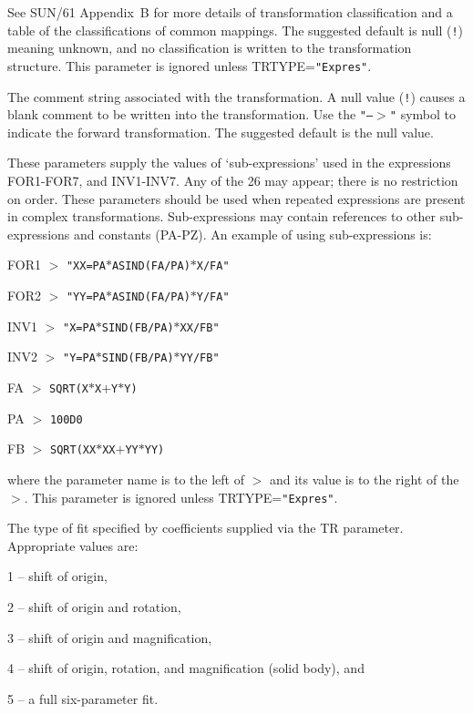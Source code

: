 \documentclass[twoside,11pt]{article}
\newcommand{\sstsubsection}[1]{ \item[{#1}] \mbox{} \\}
\renewcommand{\sstsubsection}[1]{\item[{#1}]}
\begin{document}
{{{         See SUN/61 Appendix~B for more details of transformation
         classification and a table of the classifications of common
         mappings.  The suggested default is null ({\tt !}) meaning unknown,
         and no classification is written to the transformation
         structure.  This parameter is ignored unless TRTYPE={\tt "Expres"}.
      }
      \sstsubsection{
         COMMENT = LITERAL (Read)
      }{
         The comment string associated with the transformation.
         A null value ({\tt !}) causes a blank comment to be written into
         the transformation.  Use the {\tt "--$>$"} symbol to indicate the
         forward transformation.  The suggested default is the null value.
      }
      \sstsubsection{
         FA-FZ = LITERAL (Read)
      }{
         These parameters supply the values of `sub-expressions' used
         in the expressions FOR1-FOR7, and INV1-INV7.  Any of the 26
         may appear; there is no restriction on order.  These
         parameters should be used when repeated expressions are
         present in complex transformations.  Sub-expressions may
         contain references to other sub-expressions and constants
         (PA-PZ).  An example of using sub-expressions is:
         \begin{description}
         \item FOR1 $>$ {\tt "XX=PA$*$ASIND(FA/PA)$*$X/FA"}
         \item FOR2 $>$ {\tt "YY=PA$*$ASIND(FA/PA)$*$Y/FA"}
         \item INV1 $>$ {\tt "X=PA$*$SIND(FB/PA)$*$XX/FB"}
         \item INV2 $>$ {\tt "Y=PA$*$SIND(FB/PA)$*$YY/FB"}
         \item FA $>$ {\tt SQRT(X$*$X$+$Y$*$Y)}
         \item PA $>$ {\tt 100D0}
         \item FB $>$ {\tt SQRT(XX$*$XX$+$YY$*$YY)}
         \end{description}
         where the parameter name is to the left of $>$ and its value is
         to the right of the $>$.  This parameter is ignored unless
         TRTYPE={\tt "Expres"}.
      }
      \sstsubsection{
         FITTYPE = \_INTEGER (Read)
      }{
         The type of fit specified by coefficients supplied via the
         TR parameter.  Appropriate values are:
         \begin{description}
         \item 1 -- shift of origin,
         \item 2 -- shift of origin and rotation,
         \item 3 -- shift of origin and magnification,
         \item 4 -- shift of origin, rotation, and magnification
                   (solid body), and
         \item 5 -- a full six-parameter fit.
         \end{description}

}}}
\end{document}
